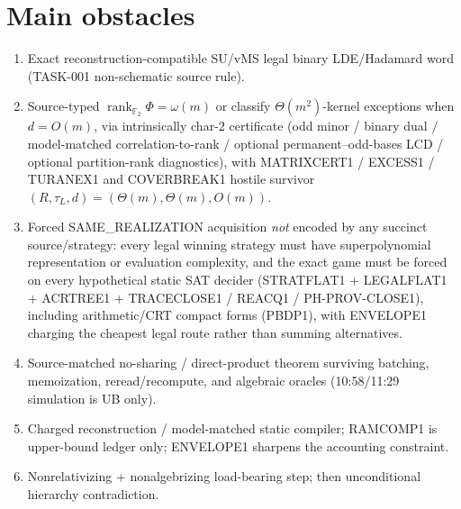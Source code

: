 \documentclass[11pt]{article}
\begin{document}
\section*{Main obstacles}
\begin{enumerate}
\item Exact reconstruction-compatible SU/vMS legal binary LDE/Hadamard word (TASK-001
non-schematic source rule).
\item Source-typed $\operatorname{rank}_{\mathbb F_2}\Phi=\omega(m)$ or classify
$\Theta(m^2)$-kernel exceptions when $d=O(m)$, via intrinsically char-$2$ certificate
(odd minor / binary dual / model-matched correlation-to-rank / optional permanent--odd-bases
LCD / optional partition-rank diagnostics), with MATRIXCERT1 / EXCESS1 / TURANEX1 and
COVERBREAK1 hostile survivor $(R,\tau_L,d)=(\Theta(m),\Theta(m),O(m))$.
\item Forced SAME\_REALIZATION acquisition \emph{not} encoded by any succinct source/strategy:
every legal winning strategy must have superpolynomial representation or evaluation complexity,
and the exact game must be forced on every hypothetical static SAT decider
(STRATFLAT1 + LEGALFLAT1 + ACRTREE1 + TRACECLOSE1 / REACQ1 / PH-PROV-CLOSE1),
including arithmetic/CRT compact forms (PBDP1), with ENVELOPE1 charging the cheapest
legal route rather than summing alternatives.
\item Source-matched no-sharing / direct-product theorem surviving batching, memoization,
reread/recompute, and algebraic oracles (10:58/11:29 simulation is UB only).
\item Charged reconstruction / model-matched static compiler; RAMCOMP1 is upper-bound ledger only;
ENVELOPE1 sharpens the accounting constraint.
\item Nonrelativizing + nonalgebrizing load-bearing step; then unconditional hierarchy contradiction.
\end{enumerate}
\end{document}
